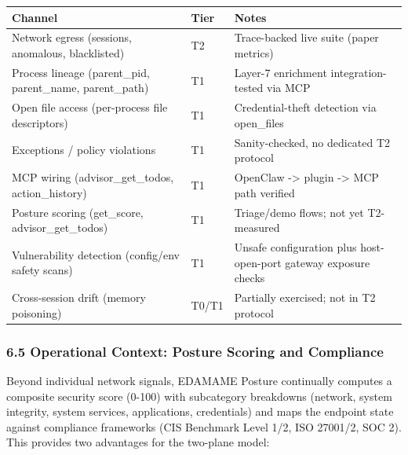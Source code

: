 \documentclass[
]{article}
\newcounter{none} %
\begin{document}
{\def\LTcaptype{none} %
\begin{longtable}[]{@{}
  >{\raggedright\arraybackslash}p{}
  >{\raggedright\arraybackslash}p{}
  >{\raggedright\arraybackslash}p{}@{}}
\toprule\noalign{}
\begin{minipage}[b]{\linewidth}\raggedright
Channel
\end{minipage} & \begin{minipage}[b]{\linewidth}\raggedright
Tier
\end{minipage} & \begin{minipage}[b]{\linewidth}\raggedright
Notes
\end{minipage} \\
\midrule\noalign{}
\endhead
\bottomrule\noalign{}
\endlastfoot
Network egress (sessions, anomalous, blacklisted) & T2 & Trace-backed
live suite (paper metrics) \\
Process lineage (parent\_pid, parent\_name, parent\_path) & T1 & Layer-7
enrichment integration-tested via MCP \\
Open file access (per-process file descriptors) & T1 & Credential-theft
detection via open\_files \\
Exceptions / policy violations & T1 & Sanity-checked, no dedicated T2
protocol \\
MCP wiring (advisor\_get\_todos, action\_history) & T1 & OpenClaw
-\textgreater{} plugin -\textgreater{} MCP path verified \\
Posture scoring (get\_score, advisor\_get\_todos) & T1 & Triage/demo
flows; not yet T2-measured \\
Vulnerability detection (config/env safety scans) & T1 & Unsafe
configuration plus host-open-port gateway exposure checks \\
Cross-session drift (memory poisoning) & T0/T1 & Partially exercised;
not in T2 protocol \\
\end{longtable}
}

\subsubsection{6.5 Operational Context: Posture Scoring and
Compliance}\label{operational-context-posture-scoring-and-compliance}

Beyond individual network signals, EDAMAME Posture continually computes
a composite security score (0-100) with subcategory breakdowns (network,
system integrity, system services, applications, credentials) and maps
the endpoint state against compliance frameworks (CIS Benchmark Level
1/2, ISO 27001/2, SOC 2). This provides two advantages for the two-plane
model:
\end{document}

